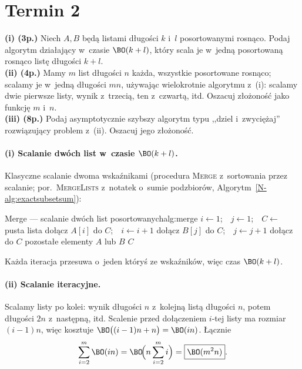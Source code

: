 \section{Termin 2}

\begin{zadanie}
	\textbf{(i) (3p.)} Niech $A,B$ będą listami długości $k$ i~$l$ posortowanymi
	rosnąco. Podaj algorytm działający w~czasie $\BO(k+l)$, który scala je w~jedną
	posortowaną rosnąco listę długości $k+l$.\\
	\textbf{(ii) (4p.)} Mamy $m$ list długości $n$ każda, wszystkie posortowane
	rosnąco; scalamy je w~jedną długości $mn$, używając wielokrotnie algorytmu
	z~(i): scalamy dwie pierwsze listy, wynik z~trzecią, ten z~czwartą, itd.
	Oszacuj złożoność jako funkcję $m$ i~$n$.\\
	\textbf{(iii) (8p.)} Podaj asymptotycznie szybszy algorytm typu ,,dziel
	i~zwyciężaj'' rozwiązujący problem z~(ii). Oszacuj jego złożoność.
\end{zadanie}

\paragraph{(i) Scalanie dwóch list w~czasie $\BO(k+l)$.}
Klasyczne scalanie dwoma wskaźnikami (procedura \textsc{Merge} z~sortowania
przez scalanie; por.\ \textsc{MergeLists} z~notatek o~sumie podzbiorów,
Algorytm~\ref{N-alg:exactsubsetsum}):

\begin{alg}{Merge --- scalanie dwóch list posortowanych}{alg:merge}
	\State $i\gets 1$;\ \ $j\gets 1$;\ \ $C\gets$ pusta lista
	\State dołącz $A[i]$ do $C$;\ \ $i\gets i+1$
	\Else
	\State dołącz $B[j]$ do $C$;\ \ $j\gets j+1$
	\EndIf
	\EndWhile
	\State dołącz do $C$ pozostałe elementy $A$ lub $B$
	\State \Return $C$
	\EndFunction
\end{alg}
Każda iteracja przesuwa o~jeden któryś ze wskaźników, więc czas $\BO(k+l)$.

\paragraph{(ii) Scalanie iteracyjne.}
Scalamy listy po kolei: wynik długości $n$ z~kolejną listą długości $n$, potem
długości $2n$ z~następną, itd. Scalenie przed dołączeniem $i$-tej listy ma
rozmiar $(i-1)n$, więc kosztuje $\BO\big((i-1)n+n\big)=\BO(in)$. Łącznie
\[
	\sum_{i=2}^{m}\BO(in)=\BO\!\Big(n\sum_{i=2}^{m} i\Big)=\boxed{\BO(m^2 n)}.
\]


